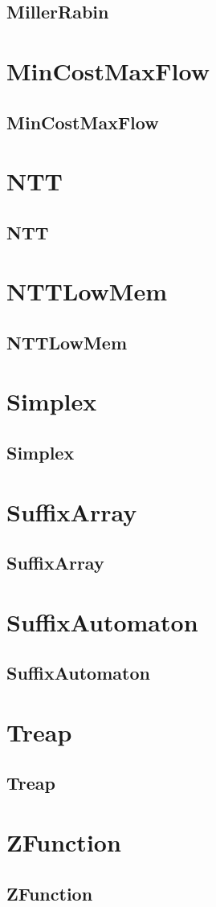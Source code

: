 \documentclass[a4paper, twocolumn]{article}
\begin{document}
\subsection{MillerRabin}

\section{MinCostMaxFlow}
\subsection{MinCostMaxFlow}

\section{NTT}
\subsection{NTT}

\section{NTTLowMem}
\subsection{NTTLowMem}

\section{Simplex}
\subsection{Simplex}

\section{SuffixArray}
\subsection{SuffixArray}

\section{SuffixAutomaton}
\subsection{SuffixAutomaton}

\section{Treap}
\subsection{Treap}

\section{ZFunction}
\subsection{ZFunction}

\end{document}
